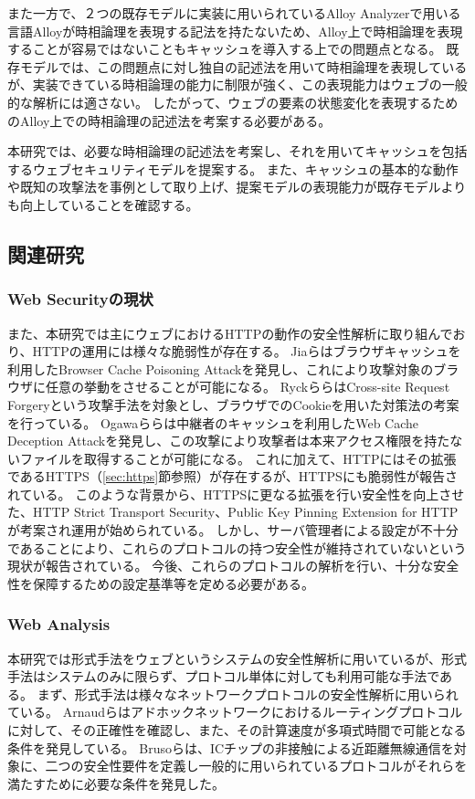\documentclass[journal]{IEEEtran}
\begin{document}
また一方で、２つの既存モデルに実装に用いられているAlloy Analyzerで用いる言語Alloyが時相論理を表現する記法を持たないため、Alloy上で時相論理を表現することが容易ではないこともキャッシュを導入する上での問題点となる。
既存モデル\cite{based-model, cookie-model}では、この問題点に対し独自の記述法を用いて時相論理を表現しているが、実装できている時相論理の能力に制限が強く、この表現能力はウェブの一般的な解析には適さない。
したがって、ウェブの要素の状態変化を表現するためのAlloy上での時相論理の記述法を考案する必要がある。

本研究では、必要な時相論理の記述法を考案し、それを用いてキャッシュを包括するウェブセキュリティモデルを提案する。
また、キャッシュの基本的な動作や既知の攻撃法を事例として取り上げ、提案モデルの表現能力が既存モデルよりも向上していることを確認する。

\subsection{関連研究}
\subsubsection{Web Securityの現状}
また、本研究では主にウェブにおけるHTTPの動作の安全性解析に取り組んでおり、HTTPの運用には様々な脆弱性が存在する。
Jiaら\cite{bcpattack}はブラウザキャッシュを利用したBrowser Cache Poisoning Attackを発見し、これにより攻撃対象のブラウザに任意の挙動をさせることが可能になる。
Ryckら\cite{cookie-model}らはCross-site Request Forgeryという攻撃手法を対象とし、ブラウザでのCookieを用いた対策法の考案を行っている。
Ogawaら\cite{WCD}らは中継者のキャッシュを利用したWeb Cache Deception Attackを発見し、この攻撃により攻撃者は本来アクセス権限を持たないファイルを取得することが可能になる。
これに加えて、HTTPにはその拡張であるHTTPS（\ref{sec:https}節参照）が存在するが、HTTPSにも脆弱性が報告されている\cite{poodle}。
このような背景から、HTTPSに更なる拡張を行い安全性を向上させた、HTTP Strict Transport Security\cite{hsts}、Public Key Pinning Extension for HTTP\cite{hpkp}が考案され運用が始められている。
しかし、サーバ管理者による設定が不十分であることにより、これらのプロトコルの持つ安全性が維持されていないという現状が報告されている\cite{hstshpkp}。
今後、これらのプロトコルの解析を行い、十分な安全性を保障するための設定基準等を定める必要がある。

\subsubsection{Web Analysis}
本研究では形式手法をウェブというシステムの安全性解析に用いているが、形式手法はシステムのみに限らず、プロトコル単体に対しても利用可能な手法である。
まず、形式手法は様々なネットワークプロトコルの安全性解析に用いられている。
Arnaudら\cite{modeling-and-verifying-ad-hoc}はアドホックネットワークにおけるルーティングプロトコルに対して、その正確性を確認し、また、その計算速度が多項式時間で可能となる条件を発見している。
Brusoら\cite{formal-verification-of-privacy-for}は、ICチップの非接触による近距離無線通信\cite{formal-verification-of-privacy-for}を対象に、二つの安全性要件を定義し一般的に用いられているプロトコルがそれらを満たすために必要な条件を発見した。
\end{document}
